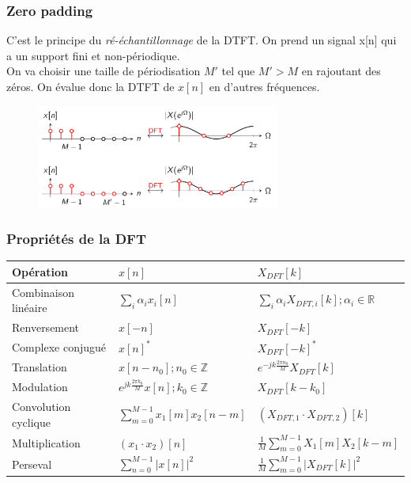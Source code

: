 \documentclass{report}
\begin{document}
\subsubsection{Zero padding}
C'est le principe du \textit{ré-échantillonnage} de la DTFT. On prend un signal x[n] qui a un support fini et non-périodique.\\
On va choisir une taille de périodisation $M'$ tel que $M'>M$ en rajoutant des zéros. On évalue donc la DTFT de $x[n]$ en d'autres fréquences.
\begin{figure}[H]
\centering
\includegraphics[width=8cm]{img/zero.png}
\end{figure}

\subsubsection{Propriétés de la DFT}

\begin{center}
\begin{tabular}{| m{2cm} | m{4cm} | m{4cm} |}
\hline
Opération &$x[n]$& $X_{DFT}[k]$\\
\hline
Combinaison linéaire & $\sum_i \alpha_i x_i[n]$ & $\sum_i \alpha_i X_{DFT,i} [k]; \alpha_i \in \mathbb{R}$ \\
\hline
Renversement & $x[-n]$ & $X_{DFT}[-k]$ \\
\hline
Complexe conjugué & $x[n]^{\ast}$ & $X_{DFT}[-k]^{\ast}$\\
\hline
Translation & $x[n-n_0]; n_0 \in \mathbb{Z}$ & $e^{-jk\frac{2\pi n_0}{M}}X_{DFT}[k]$ \\
\hline
Modulation & $e^{jk\frac{2\pi k_0}{M}}x[n]; k_0 \in \mathbb{Z}$ & $X_{DFT}[k-k_0]$ \\
\hline
Convolution cyclique & $\sum_{m=0}^{M-1}x_1[m]x_2[n-m]$ & $(X_{DFT,1}\cdot X_{DFT,2})[k]$ \\
\hline
Multiplication & $(x_1 \cdot x_2)[n]$ & $\frac{1}{M} \sum_{m=0}^{M-1} X_1[m]X_2[k-m]$ \\
\hline
Perseval & $\sum_{n=0}^{M-1} |x[n]|^2$ & $\frac{1}{M}\sum_{m=0}^{M-1}|X_{DFT}[k]|^2$ \\
\hline
\end{tabular}
\end{center}
\end{document}
